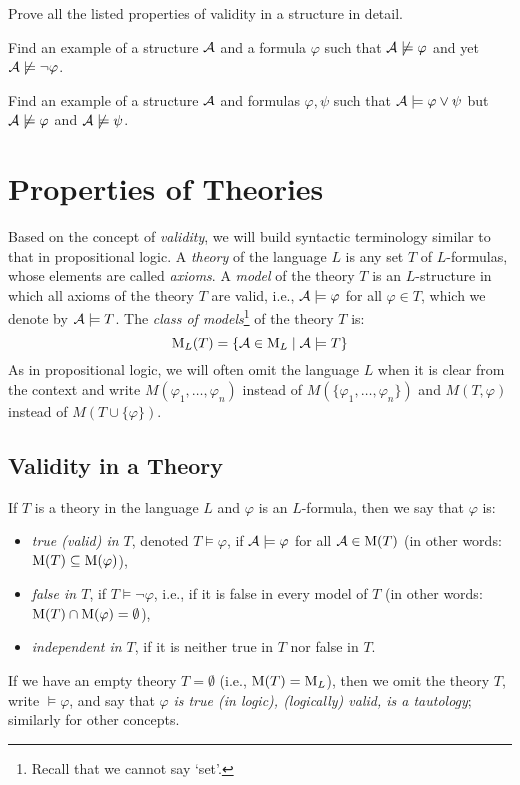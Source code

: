 \begin{exercise}
    Prove all the listed properties of validity in a structure in detail.
\end{exercise}

\begin{exercise}
    Find an example of a structure $\mathcal{A}$ and a formula $\varphi$ such that $\mathcal{A}\not\models\varphi$ and yet $\mathcal{A}\not\models\neg\varphi$.
\end{exercise}

\begin{exercise}
    Find an example of a structure $\mathcal{A}$ and formulas $\varphi,\psi$ such that $\mathcal{A}\models\varphi\lor\psi$ but $\mathcal{A}\not\models\varphi$ and $\mathcal{A}\not\models\psi$.
\end{exercise}


\section{Properties of Theories}

Based on the concept of \emph{validity}, we will build syntactic terminology similar to that in propositional logic. A \emph{theory} of the language $L$ is any set $T$ of $L$-formulas, whose elements are called \emph{axioms}. A \emph{model} of the theory $T$ is an $L$-structure in which all axioms of the theory $T$ are valid, i.e., $\mathcal{A}\models\varphi$ for all $\varphi\in T$, which we denote by $\mathcal{A}\models T$. The \emph{class of models}\footnote{Recall that we cannot say `set'.} of the theory $T$ is:
$$
\operatorname{M}_L(T)=\{\mathcal{A}\in\operatorname{M}_L\mid\mathcal{A}\models T\}
$$
As in propositional logic, we will often omit the language $L$ when it is clear from the context and write $M(\varphi_1,\dots,\varphi_n)$ instead of $M(\{\varphi_1,\dots,\varphi_n\})$ and $M(T,\varphi)$ instead of $M(T\cup\{\varphi\})$.

\subsection{Validity in a Theory}

If $T$ is a theory in the language $L$ and $\varphi$ is an $L$-formula, then we say that $\varphi$ is: 
\begin{itemize}
    \item \emph{true (valid) in $T$}, denoted $T\models\varphi$, if $\mathcal{A}\models\varphi$ for all $\mathcal{A}\in\operatorname{M}(T)$ (in other words: $\operatorname{M}(T)\subseteq\operatorname{M}(\varphi)$),
    \item \emph{false in $T$}, if $T\models\neg\varphi$, i.e., if it is false in every model of $T$ (in other words: $\operatorname{M}(T)\cap\operatorname{M}(\varphi)=\emptyset$),
    \item \emph{independent in $T$}, if it is neither true in $T$ nor false in $T$.
\end{itemize}
If we have an empty theory $T=\emptyset$ (i.e., $\operatorname{M}(T)=\operatorname{M}_L$), then we omit the theory $T$, write $\models\varphi$, and say that $\varphi$ \emph{is true (in logic), (logically) valid, is a tautology}; similarly for other concepts.

